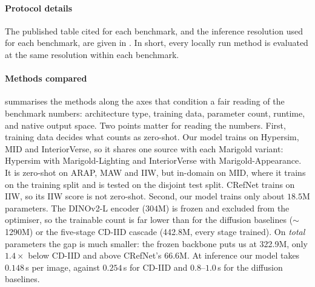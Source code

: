 \paragraph{Protocol details}
The published table cited for each benchmark, and the inference resolution used for each
benchmark, are given in . In short, every locally run method is evaluated at
the same resolution within each benchmark.

\paragraph{Methods compared}
 summarises the methods along the axes that condition a
fair reading of the benchmark numbers: architecture type, training data,
parameter count, runtime, and native output space.
Two points matter for reading the numbers. First, training data decides what counts as
zero-shot. Our model trains on Hypersim, MID and InteriorVerse, so it shares one source with
each Marigold variant: Hypersim with Marigold-Lighting and InteriorVerse with
Marigold-Appearance. It is zero-shot on ARAP, MAW and IIW, but in-domain on MID, where it
trains on the training split and is tested on the disjoint test split. CRefNet trains on IIW,
so its IIW score is not zero-shot.
Second, our model trains only about $18.5$M parameters. The DINOv2-L encoder
($304$M) is frozen and excluded from the optimiser, so the trainable count is far
lower than for the diffusion baselines ($\sim$1290M) or the five-stage CD-IID
cascade (442.8M, every stage trained). On \emph{total} parameters the gap is much
smaller: the frozen backbone puts us at 322.9M, only $1.4\times$ below CD-IID and above
CRefNet's 66.6M. At inference our model takes $0.148$\,s per image, against $0.254$\,s for
CD-IID and $0.8$--$1.0$\,s for the diffusion baselines.

